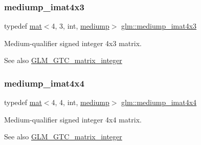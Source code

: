 \subsubsection{\texorpdfstring{mediump\+\_\+imat4x3}{mediump\_imat4x3}}
{\footnotesize\ttfamily typedef \mbox{\hyperlink{structglm_1_1mat}{mat}}$<$4, 3, int, \mbox{\hyperlink{namespaceglm_a36ed105b07c7746804d7fdc7cc90ff25a6416f3ea0c9025fb21ed50c4d6620482}{mediump}}$>$ \mbox{\hyperlink{group__gtc__matrix__integer_ga213644b63e6ee8ac783fd9a75e3c5abb}{glm\+::mediump\+\_\+imat4x3}}}

Medium-\/qualifier signed integer 4x3 matrix. \begin{DoxySeeAlso}{See also}
\mbox{\hyperlink{group__gtc__matrix__integer}{G\+L\+M\+\_\+\+G\+T\+C\+\_\+matrix\+\_\+integer}} 
\end{DoxySeeAlso}
\mbox{\label{group__gtc__matrix__integer_gaf45ac606a3fb21f46228524d1d322eb2}} 
\subsubsection{\texorpdfstring{mediump\+\_\+imat4x4}{mediump\_imat4x4}}
{\footnotesize\ttfamily typedef \mbox{\hyperlink{structglm_1_1mat}{mat}}$<$4, 4, int, \mbox{\hyperlink{namespaceglm_a36ed105b07c7746804d7fdc7cc90ff25a6416f3ea0c9025fb21ed50c4d6620482}{mediump}}$>$ \mbox{\hyperlink{group__gtc__matrix__integer_gaf45ac606a3fb21f46228524d1d322eb2}{glm\+::mediump\+\_\+imat4x4}}}

Medium-\/qualifier signed integer 4x4 matrix. \begin{DoxySeeAlso}{See also}
\mbox{\hyperlink{group__gtc__matrix__integer}{G\+L\+M\+\_\+\+G\+T\+C\+\_\+matrix\+\_\+integer}} 
\end{DoxySeeAlso}
\mbox{\label{group__gtc__matrix__integer_gaafd6d236ce051d138e3fdf53de3813e6}} 
